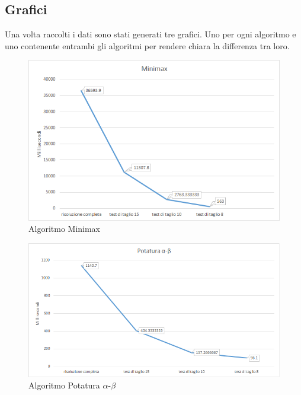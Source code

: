 	\subsection{Grafici}
	Una volta raccolti i dati sono stati generati tre grafici. Uno per ogni algoritmo e uno contenente entrambi gli algoritmi per rendere chiara la differenza tra loro.
	
	\begin{figure}[h!]
		\centering
		\includegraphics[scale=1]{grafico1.png}
		\caption{Algoritmo Minimax}
		\label{fig4}
	\end{figure}
	
	\begin{figure}[h!]
		\centering
		\includegraphics[scale=0.95]{grafico2.png}
		\caption{Algoritmo Potatura $\alpha$-$\beta$}
		\label{fig5}
	\end{figure}
	
